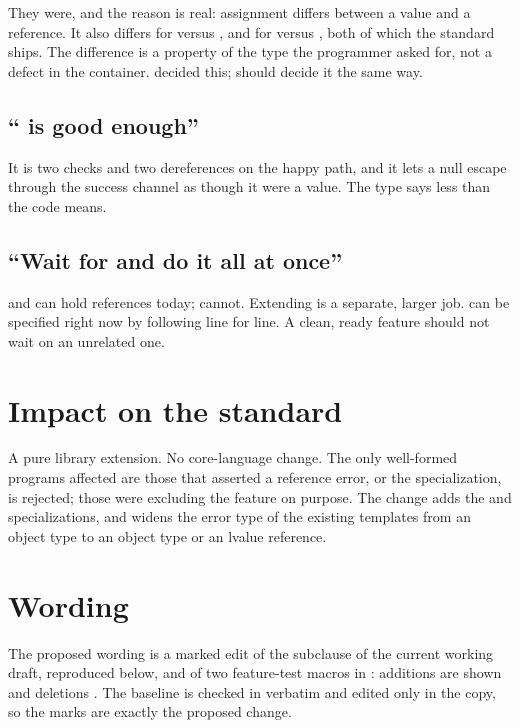 \documentclass[a4paper,10pt,oneside,openany,final,article]{memoir}
\begin{document}
They were, and the reason is real: assignment differs between a value and a
reference. It also differs for  versus , and
for  versus , both of which the standard
ships. The difference is a property of the type the programmer asked for, not a
defect in the container.  decided this; 
should decide it the same way.

\section{`` is good enough''}

It is two checks and two dereferences on the happy path, and it lets a null
 escape through the success channel as though it were a value. The
type says less than the code means.

\section{``Wait for  and do it all at once''}

 and  can hold references today; 
cannot. Extending  is a separate, larger job.
 can be specified right now by following
 line for line. A clean, ready feature should not wait on
an unrelated one.

\chapter{Impact on the standard}

A pure library extension. No core-language change. The only well-formed
programs affected are those that asserted a reference error, or the
 specialization, is rejected; those were excluding the
feature on purpose. The change adds the  and
 specializations, and widens the error type of the
existing  templates from an object type to an object type or an
lvalue reference.

\chapter{Wording}

The proposed wording is a marked edit of the \tcode{[expected]} subclause of the
current working draft, reproduced below, and of two feature-test macros in
: additions are shown 
and deletions . The baseline is checked in verbatim and
edited only in the copy, so the marks are exactly the proposed change.
\end{document}
